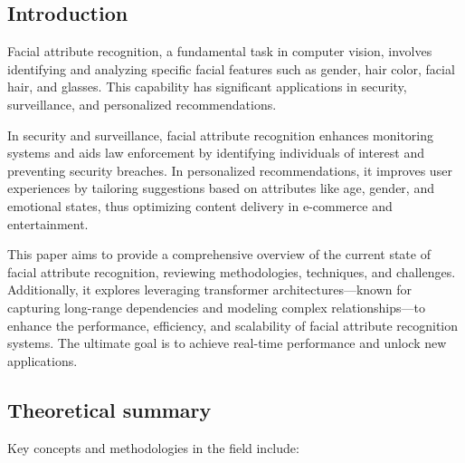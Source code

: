 \documentclass[a4paper,oneside]{article}
\begin{document}
\subsection{Introduction}
\label{sec:introduction}

Facial attribute recognition, a fundamental task in computer vision, involves identifying and analyzing specific facial features such as gender, hair color, facial hair, and glasses. This capability has significant applications in security, surveillance, and personalized recommendations.

In security and surveillance, facial attribute recognition enhances monitoring systems and aids law enforcement by identifying individuals of interest and preventing security breaches. In personalized recommendations, it improves user experiences by tailoring suggestions based on attributes like age, gender, and emotional states, thus optimizing content delivery in e-commerce and entertainment.

This paper aims to provide a comprehensive overview of the current state of facial attribute recognition, reviewing methodologies, techniques, and challenges. Additionally, it explores leveraging transformer architectures—known for capturing long-range dependencies and modeling complex relationships—to enhance the performance, efficiency, and scalability of facial attribute recognition systems. The ultimate goal is to achieve real-time performance and unlock new applications.

\subsection{Theoretical summary}
\label{sec:theoretical_summary}

Key concepts and methodologies in the field include:
\end{document}
